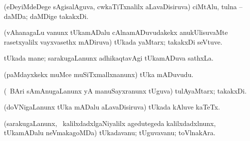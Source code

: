 {{{\bentry
{} 
\gl{\nA}
\expl{}
\bmng
(eDeyiMdeDege sAgisalAguva, cwkaTiTxnalilx aLavaDisiruva) ciMtAlu, tulna -- daMDa; daMDige takakxDi. 
\emng
\eentry

\bentry
{} 
\gl{\nA}
\expl{}
\bmng
(vAhanagaLu \mo vanunx tUkamADalu cAlnamADuvudakekx anukUlisuvaMte rasetxyalilx vayxvasethx mADiruva) tUkada yaMtarx; takakxDi seVtuve. 
\emng
\eentry

\bentry
{} 
\gl{\nA}
\expl{}
\bmng
tUkada mane; sarakugaLanunx adhikaqtavAgi tUkamADuva sathxLa. 
\emng
\eentry

\bentry
{} 
\gl{\nA}
\expl{}
\bmng
(paMdayxkekx muMce muSiTxmallxnanunx) tUka mADuvudu. 
\emng
\eentry

\bentry
{} 
\gl{\nA}
\expl{}
\bmng
(\sA\ BAri sAmAnugaLanunx yA manuSayxranunx tUguva) tulAyaMtarx; takakxDi. 
\emng
\eentry

\bentry
{} 
\gl{\nA}
\expl{}
\bmng
(doVNigaLanunx tUka mADalu aLavaDisiruva) tUkada kAluve kaTeTx. 
\emng
\eentry

\bentry
{} 
\gl{\nA}
\expl{}
\bmng
(sarakugaLanunx, \kanmu\ kalilxdadxlgaNiyalilx agedutegeda kalilxdadxlnunx, tUkamADalu neVmakagoMDa) tUkadavanu; tUguvavanu; toVlnakAra. 
\emng
\eentry

}}}
